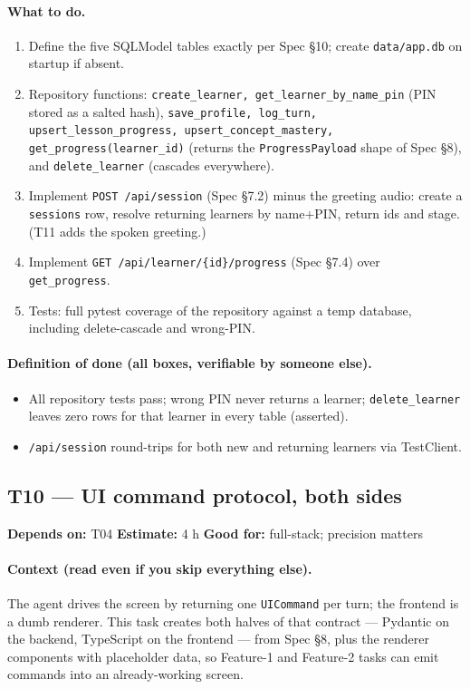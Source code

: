 \documentclass[11pt]{article}
\newcommand{\code}[1]{\texttt{#1}}
\newcommand{\taskmeta}[3]{\noindent\textbf{Depends on:} #1 \quad\textbullet\quad \textbf{Estimate:} #2 \quad\textbullet\quad \textbf{Good for:} #3\par\vspace{2pt}}
\newcommand{\ctx}[1]{\paragraph{Context (read even if you skip everything else).} #1}
\newcommand{\dod}{\paragraph{Definition of done (all boxes, verifiable by someone else).}}
\begin{document}
\paragraph{What to do.}
\begin{enumerate}
  \item Define the five SQLModel tables exactly per Spec \S10; create \code{data/app.db} on startup if absent.
  \item Repository functions: \code{create\_learner, get\_learner\_by\_name\_pin} (PIN stored as a salted hash), \code{save\_profile, log\_turn, upsert\_lesson\_progress, upsert\_concept\_mastery, get\_progress(learner\_id)} (returns the \code{ProgressPayload} shape of Spec \S8), and \code{delete\_learner} (cascades everywhere).
  \item Implement \code{POST /api/session} (Spec \S7.2) minus the greeting audio: create a \code{sessions} row, resolve returning learners by name+PIN, return ids and stage. (T11 adds the spoken greeting.)
  \item Implement \code{GET /api/learner/\{id\}/progress} (Spec \S7.4) over \code{get\_progress}.
  \item Tests: full pytest coverage of the repository against a temp database, including delete-cascade and wrong-PIN.
\end{enumerate}
\dod
\begin{itemize}
  \item All repository tests pass; wrong PIN never returns a learner; \code{delete\_learner} leaves zero rows for that learner in every table (asserted).
  \item \code{/api/session} round-trips for both new and returning learners via TestClient.
\end{itemize}

\subsection{T10 --- UI command protocol, both sides \dag}
\taskmeta{T04}{4 h}{full-stack; precision matters}
\ctx{The agent drives the screen by returning one \code{UICommand} per turn; the frontend is a dumb renderer. This task creates both halves of that contract --- Pydantic on the backend, TypeScript on the frontend --- from Spec \S8, plus the renderer components with placeholder data, so Feature-1 and Feature-2 tasks can emit commands into an already-working screen.}
\end{document}

